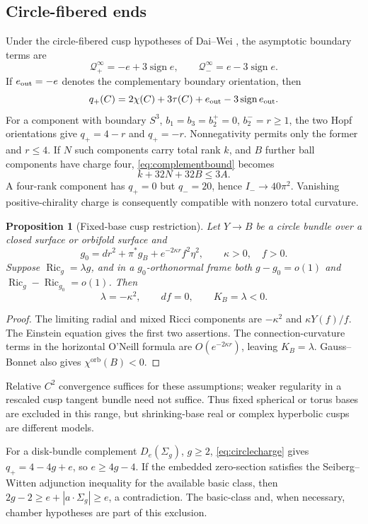 \documentclass[11pt,a4paper]{article}
\newtheorem{proposition}[theorem]{Proposition}
\theoremstyle{definition}\newtheorem{definition}[theorem]{Definition}
\theoremstyle{remark}\newtheorem{remark}[theorem]{Remark}
\newcommand{\Ric}{\operatorname{Ric}}
\newcommand{\orb}{\mathrm{orb}}
\begin{document}
\subsection{Circle-fibered ends}
Under the circle-fibered cusp hypotheses of Dai--Wei \cite{DaiWei}, the asymptotic boundary terms are
\[
 \mathscr Q_+^\infty=-e+3\operatorname{sign}e,
 \qquad\mathscr Q_-^\infty=e-3\operatorname{sign}e.
\]
If $e_{\rm out}=-e$ denotes the complementary boundary orientation, then
\begin{equation}\label{eq:circlecharge}
 q_+(C)=2\chi(C)+3\tau(C)+e_{\rm out}-3\operatorname{sign}e_{\rm out}.
\end{equation}
For a component with boundary $S^3$, $b_1=b_3=b_2^+=0$, $b_2^-=r\ge1$, the two Hopf orientations give $q_+=4-r$ and $q_+=-r$. Nonnegativity permits only the former and $r\le4$. If $N$ such components carry total rank $k$, and $B$ further ball components have charge four, \eqref{eq:complementbound} becomes
\[
 k+32N+32B\le3A.
\]
A four-rank component has $q_+=0$ but $q_-=20$, hence $I_-\to40\pi^2$. Vanishing positive-chirality charge is consequently compatible with nonzero total curvature.

\begin{proposition}[Fixed-base cusp restriction]\label{prop:cusp}
Let $Y\to B$ be a circle bundle over a closed surface or orbifold surface and
\[
 g_0=dr^2+\pi^*g_B+e^{-2\kappa r}f^2\eta^2,\qquad\kappa>0,\quad f>0.
\]
Suppose $\Ric_g=\lambda g$, and in a $g_0$-orthonormal frame both $g-g_0=o(1)$ and $\Ric_g-\Ric_{g_0}=o(1)$. Then
\[
 \lambda=-\kappa^2,\qquad df=0,\qquad K_B=\lambda<0.
\]
\end{proposition}
\begin{proof}
The limiting radial and mixed Ricci components are $-\kappa^2$ and $\kappa Y(f)/f$. The Einstein equation gives the first two assertions. The connection-curvature terms in the horizontal O'Neill formula are $O(e^{-2\kappa r})$, leaving $K_B=\lambda$. Gauss--Bonnet also gives $\chi^\orb(B)<0$.
\end{proof}
Relative $C^2$ convergence suffices for these assumptions; weaker regularity in a rescaled cusp tangent bundle need not suffice. Thus fixed spherical or torus bases are excluded in this range, but shrinking-base real or complex hyperbolic cusps are different models.

For a disk-bundle complement $D_e(\Sigma_g)$, $g\ge2$, \eqref{eq:circlecharge} gives $q_+=4-4g+e$, so $e\ge4g-4$. If the embedded zero-section satisfies the Seiberg--Witten adjunction inequality for the available basic class, then
$2g-2\ge e+|a\cdot\Sigma_g|\ge e$, a contradiction. The basic-class and, when necessary, chamber hypotheses are part of this exclusion.
\end{document}
